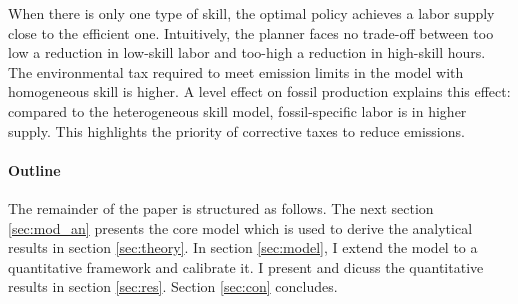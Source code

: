 When there is only one type of skill, the optimal policy achieves a labor supply close to the efficient one. Intuitively, the planner faces no trade-off between too low a reduction in low-skill labor and too-high a reduction in high-skill hours.
The environmental tax required to meet emission limits in the model with homogeneous skill is higher. A level effect on fossil production  explains this effect: compared to the heterogeneous skill model, fossil-specific labor is in higher supply. This highlights the priority of corrective taxes to reduce emissions. 











\paragraph{Outline}
The remainder of the paper is structured as follows. The next section \ref{sec:mod_an} presents the core model which is used to derive the analytical results in section \ref{sec:theory}. In section \ref{sec:model}, I extend the model to a quantitative framework and calibrate it. I present and dicuss the quantitative results in section \ref{sec:res}. Section \ref{sec:con} concludes.